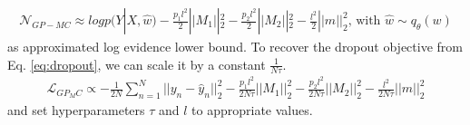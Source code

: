 \documentclass[a4paper,cleardoubleempty,BCOR1cm, 11pt]{report}
\begin{document}
\begin{align*}
\mathcal{N}_{GP-MC} \approx log p(Y|X, \hat{w}) - \frac{p_1 l^2}{2} ||M_1||^2_2 - \frac{p_2 l^2}{2}||M_2||^2_2 - \frac{l^2}{2}||m||^2_2 \text{, with } \hat{w} \sim q_{\theta}(w)
\end{align*}
as approximated log evidence lower bound.
To recover the dropout objective from Eq. \ref{eq:dropout}, we can scale it by a constant $\frac{1}{N \tau}$.
\begin{align*}
\mathcal{L}_{GP_MC} \propto  - \frac{1}{2N} \sum_{n=1}^N ||y_n - \hat{y}_n||^2_2 -  \frac{p_1 l^2}{2N\tau} ||M_1||^2_2 - \frac{p_2 l^2}{2N\tau}||M_2||^2_2 - \frac{l^2}{2N\tau}||m||^2_2
\end{align*}
and set hyperparameters $\tau$ and $l$ to appropriate values.
\end{document}
